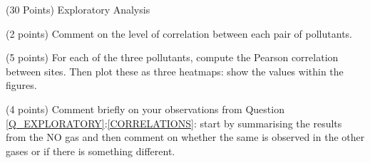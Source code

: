 \documentclass[12pt]{article}
\begin{document}
\begin{question}{\label{Q_EXPLORATORY}(30 Points) Exploratory Analysis}
\begin{subquestion}{(2 points) Comment on the level of correlation between each pair of pollutants.}
\end{subquestion}



\begin{subquestion}{\label{CORRELATIONS}(5 points) For each of the three pollutants, compute the Pearson correlation between sites.  Then plot these as three heatmaps: show the values within the figures. }






\end{subquestion}

\begin{subquestion}{(4 points) Comment briefly on your observations from Question \ref{Q_EXPLORATORY}:\ref{CORRELATIONS}: start by summarising the results from the NO gas and then comment on whether the same is observed in the other gases or if there is something different.}




\end{subquestion}
\end{question}
\end{document}
